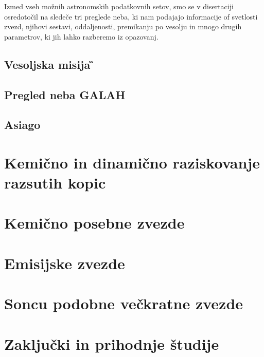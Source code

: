 Izmed vseh možnih astronomskih podatkovnih setov, smo se v disertaciji osredotočil na sledeče tri preglede neba, ki nam podajajo informacije of svetlosti zvezd, njihovi sestavi, oddaljenosti, premikanju po vesolju in mnogo drugih parametrov, ki jih lahko razberemo iz opazovanj.

\subsection{Vesoljska misija \G}

\subsection{Pregled neba GALAH}

\subsection{Asiago}


\section{Kemično in dinamično raziskovanje razsutih kopic}
\label{sec:slo_kopice_taziskovanje}


\section{Kemično posebne zvezde}
\label{sec:slo_c_peculiars}


\section{Emisijske zvezde}
\label{sec:slo_emisijske}


\section{Soncu podobne večkratne zvezde}
\label{sec:slo_soncevi_veckratniki}


\section{Zaključki in prihodnje študije}
\label{sec:slo_zakljucek}

